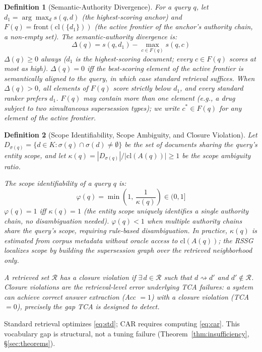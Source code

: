 \documentclass[11pt]{article}
\newtheorem{definition}{Definition}
\begin{document}
\begin{definition}[Semantic-Authority Divergence]
\label{def:divergence}
For a query $q$, let $d_1 = \arg\max_d s(q,d)$ (the highest-scoring anchor) and $F(q) = \mathrm{front}(\mathrm{cl}(\{d_1\}))$ (the active frontier of the anchor's authority chain, a non-empty set). The \emph{semantic-authority divergence} is:
\[
  \Delta(q) = s(q,d_1) - \max_{c \in F(q)} s(q,c)
\]
$\Delta(q) \geq 0$ always ($d_1$ is the highest-scoring document; every $c \in F(q)$ scores at most as high). $\Delta(q) = 0$ iff the best-scoring element of the active frontier is semantically aligned to the query, in which case standard retrieval suffices. When $\Delta(q) > 0$, all elements of $F(q)$ score strictly below $d_1$, and every standard ranker prefers $d_1$. $F(q)$ may contain more than one element (e.g., a drug subject to two simultaneous supersession types); we write $c^* \in F(q)$ for any element of the active frontier.
\end{definition}

\begin{definition}[Scope Identifiability, Scope Ambiguity, and Closure Violation]
\label{def:ambiguity}
Let $D_{\sigma(q)} = \{d \in K : \sigma(q) \cap \sigma(d) \neq \emptyset\}$ be the set of documents sharing the query's entity scope, and let $\kappa(q) = |D_{\sigma(q)}|/|\mathrm{cl}(A(q))| \geq 1$ be the \emph{scope ambiguity ratio}.

The \emph{scope identifiability} of a query $q$ is:
\[
  \varphi(q) = \min\!\left(1,\, \frac{1}{\kappa(q)}\right) \in (0, 1]
\]
$\varphi(q) = 1$ iff $\kappa(q) = 1$ (the entity scope uniquely identifies a single authority chain, no disambiguation needed). $\varphi(q) < 1$ when multiple authority chains share the query's scope, requiring rule-based disambiguation. In practice, $\kappa(q)$ is estimated from corpus metadata without oracle access to $\mathrm{cl}(A(q))$; the RSSG localizes scope by building the supersession graph over the retrieved neighborhood only.

A retrieved set $\mathcal{R}$ has a \emph{closure violation} if $\exists\, d \in \mathcal{R}$ such that $d \rightsquigarrow d'$ and $d' \notin \mathcal{R}$. Closure violations are the retrieval-level error underlying TCA failures: a system can achieve correct answer extraction (Acc $= 1$) with a closure violation (TCA $= 0$), precisely the gap TCA is designed to detect.
\end{definition}

Standard retrieval optimizes \eqref{eq:std}; CAR requires computing \eqref{eq:car}. This vocabulary gap is structural, not a tuning failure (Theorem~\ref{thm:insufficiency}, \S\ref{sec:theorems}).
\end{document}
